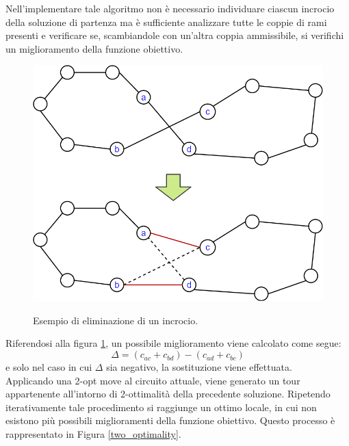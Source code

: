 Nell'implementare tale algoritmo non è necessario individuare ciascun incrocio della soluzione di partenza ma è sufficiente analizzare tutte le coppie di rami presenti e verificare se, scambiandole con un'altra coppia ammissibile, si verifichi un miglioramento della funzione obiettivo.
\begin{figure}[H] 
\begin{center} 
  \includegraphics[scale=0.4]{Images/swap}\\ 
  \caption{\footnotesize{Esempio di eliminazione di un incrocio.}}
  \label{swap}
\end{center}
\end{figure}
Riferendosi alla figura \ref{swap}, un possibile miglioramento viene calcolato come segue:\\
$$\Delta = (c_{ac} + c_{bd}) - (c_{ad} + c_{bc})$$
e solo nel caso in cui $\Delta$ sia negativo, la sostituzione viene effettuata.\\
Applicando una 2-opt move al circuito attuale, viene generato un tour appartenente all'intorno di 2-ottimalità della precedente soluzione. Ripetendo iterativamente tale procedimento si raggiunge un ottimo locale, in cui non esistono più possibili miglioramenti della funzione obiettivo. Questo processo è rappresentato in Figura \ref{two_optimality}. 
